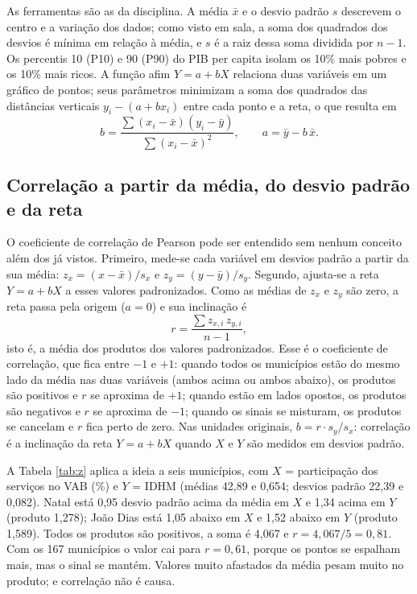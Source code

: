 \documentclass[12pt,a4paper]{article}
\begin{document}
As ferramentas são as da disciplina. A média $\bar{x}$ e o desvio padrão $s$ descrevem o centro e a variação dos dados; como visto em sala, a soma dos quadrados dos desvios é mínima em relação à média, e $s$ é a raiz dessa soma dividida por $n-1$. Os percentis 10 (P10) e 90 (P90) do PIB per capita isolam os 10\% mais pobres e os 10\% mais ricos. A função afim $Y = a + bX$ relaciona duas variáveis em um gráfico de pontos; seus parâmetros minimizam a soma dos quadrados das distâncias verticais $y_i - (a + b x_i)$ entre cada ponto e a reta, o que resulta em
\begin{equation}
b = \frac{\sum (x_i - \bar{x})(y_i - \bar{y})}{\sum (x_i - \bar{x})^2}, \qquad a = \bar{y} - b\,\bar{x}.
\end{equation}

\subsection{Correlação a partir da média, do desvio padrão e da reta}

O coeficiente de correlação de Pearson pode ser entendido sem nenhum conceito além dos já vistos. Primeiro, mede-se cada variável em desvios padrão a partir da sua média: $z_x = (x - \bar{x})/s_x$ e $z_y = (y - \bar{y})/s_y$. Segundo, ajusta-se a reta $Y = a + bX$ a esses valores padronizados. Como as médias de $z_x$ e $z_y$ são zero, a reta passa pela origem ($a = 0$) e sua inclinação é
\begin{equation}
r = \frac{\sum z_{x,i}\, z_{y,i}}{n - 1},
\end{equation}
isto é, a média dos produtos dos valores padronizados. Esse é o coeficiente de correlação, que fica entre $-1$ e $+1$: quando todos os municípios estão do mesmo lado da média nas duas variáveis (ambos acima ou ambos abaixo), os produtos são positivos e $r$ se aproxima de $+1$; quando estão em lados opostos, os produtos são negativos e $r$ se aproxima de $-1$; quando os sinais se misturam, os produtos se cancelam e $r$ fica perto de zero. Nas unidades originais, $b = r \cdot s_y / s_x$: correlação é a inclinação da reta $Y = a + bX$ quando $X$ e $Y$ são medidos em desvios padrão.

A Tabela \ref{tab:z} aplica a ideia a seis municípios, com $X$ = participação dos serviços no VAB (\%) e $Y$ = IDHM (médias 42,89 e 0,654; desvios padrão 22,39 e 0,082). Natal está 0,95 desvio padrão acima da média em $X$ e 1,34 acima em $Y$ (produto 1,278); João Dias está 1,05 abaixo em $X$ e 1,52 abaixo em $Y$ (produto 1,589). Todos os produtos são positivos, a soma é 4,067 e $r = 4{,}067/5 = 0{,}81$. Com os 167 municípios o valor cai para $r = 0{,}61$, porque os pontos se espalham mais, mas o sinal se mantém. Valores muito afastados da média pesam muito no produto; e correlação não é causa.
\end{document}
